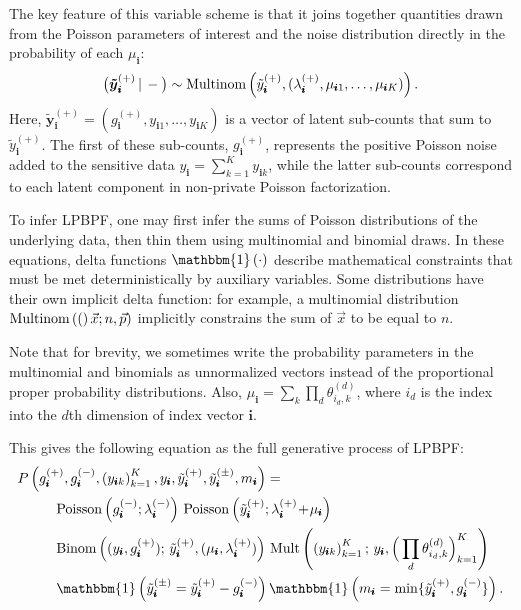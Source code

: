 \documentclass{article}
\newcommand{\subs}{\pmb{i}}
\newcommand{\wsup}[2]{#1_{\subs}^{(#2)}}
\newcommand{\ytP}{\wsup{\tilde{y}}{+}}
\newcommand{\ytPM}{\wsup{\tilde{y}}{\pm}}
\newcommand{\ysk}{y_{\subs k}}
\newcommand{\ys}{y_{\subs}}
\newcommand{\lamP}{\wsup{\lambda}{+}}
\newcommand{\lamM}{\wsup{\lambda}{-}}
\newcommand{\gP}{\wsup{g}{+}}
\newcommand{\gM}{\wsup{g}{-}}
\newcommand{\mus}{\mu_{\subs}}
\newcommand{\ms}{m_{\subs}}
\newcommand{\yvtP}{\boldsymbol{\tilde{y}}_{\subs}^{(+)}}
\newcommand{\Multi}[1]{\textup{Multinom}\left( #1 \right)}
\newcommand{\Pois}[1]{\textup{Poisson}\left( #1 \right)}
\newcommand{\given}{\,|\,}
\newcommand{\tp}{\!+\!}
\newcommand{\compcond}[1]{\big(#1\given-\big)}
\begin{document}
  The key feature of this variable scheme is that it joins together quantities drawn from
  the Poisson parameters of interest and the noise
  distribution directly in the probability of each $\mus$:
  \begin{equation}
    \compcond{\yvtP} \sim \Multi{\ytP, (\lamP, \mu_{\subs 1}, \dots, \mu_{\subs K})}.
  \end{equation} 
  Here, $\yvtP=(\gP, y_{\subs 1}, \dots, y_{\subs K})$ is a vector of latent
  sub-counts that sum to $\ytP$. The first of these sub-counts, $\gP$, represents
  the positive Poisson noise added to the sensitive data $\ys=\sum_{k=1}^K \ysk$,
  while the latter sub-counts correspond to each latent component in non-private
  Poisson factorization.

To infer LPBPF, one may first infer the sums of Poisson distributions of the
underlying data, then thin them using multinomial and binomial draws. In these
equations, delta functions $\mathbbm{1}\left( \cdot \right)$ describe
mathematical constraints that must be met deterministically by auxiliary variables. Some distributions have their own implicit
delta function: for example, a multinomial distribution $\Multi(\vec{x}; n,
\vec{p})$ implicitly constrains the sum of $\vec{x}$ to be
equal to $n$.

Note that for brevity, we sometimes write the probability parameters in the multinomial and
binomials as unnormalized vectors instead of the proportional proper probability distributions.
Also, $\mu_{\subs} = \sum_k \prod_d
\theta_{i_d,k}^{(d)}$, where $i_d$ is the index into the $d$th dimension of
index vector $\subs$.

This gives the following equation as the full generative process of LPBPF:
\begin{align} 
  P &\left(\gP, \gM, \left(\ysk\right)_{k=1}^K, \ys,
    \ytP, \ytPM, \ms\right) = \notag \\
  &\quad\quad \Pois{\gM; \lamM} \,
    \Pois { \ytP; \lamP \tp \mu_{\subs} }
    \notag \\
  &\quad\quad \text{Binom}\left((\ys, \gP);\, \ytP,(\mu_{\subs}, \lamP)\right) \, \text{Mult}\left(\left(\ysk\right)_{k=1}^K;\, \ys, \Big( \prod_d \theta_{i_d,k}^{(d)} \Big)_{k=1}^K\right) \notag \\
  &\quad\quad \mathbbm{1}\left(\ytPM =
    \ytP - \gM\right) \mathbbm{1} \left( \ms =
    \min\{\ytP, \gM\} \right) .
\label{eq:lpbpfpois}
\end{align}
\end{document}
